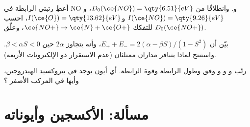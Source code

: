 \begin{exercise}[$\star\star\star$]\label{exo:b2:diatomic-mos:10}
أعطِ رتبتي الرابطة في NO و. وانطلاقًا من $D_0(\ce{NO}) = \qty{6.51}{eV}$، و$I(\ce{NO}) =
\qty{9.26}{eV}$ و$I(\ce{O}) = \qty{13.62}{eV}$، احسب $D_0(\ce{NO+})$ للتفكك $\ce{NO+} \to
\ce{N} + \ce{O+}$، وعلّق.
\end{exercise}

\begin{exercise}[$\star\star\star$]\label{exo:b2:diatomic-mos:11}
بيّن أن $E_+ + E_- = 2(\alpha - \beta S)/(1 - S^2)$، وأنه يتجاوز $2\alpha$ حين
$\beta < \alpha S < 0$. واستنتج لماذا يتنافر مداران ممتلئان (عدم الاستقرار
ذو الإلكترونات الأربعة).
\end{exercise}

\begin{exercise}[$\star\star\star$]\label{exo:b2:diatomic-mos:12}
رتّب  و و و وفق  وطول الرابطة وقوة
الرابطة. أي أيون يوجد في بيروكسيد الهيدروجين، وأيها في المركب
الأصفر ؟
\end{exercise}

\section{مسألة: الأكسجين وأيوناته}

